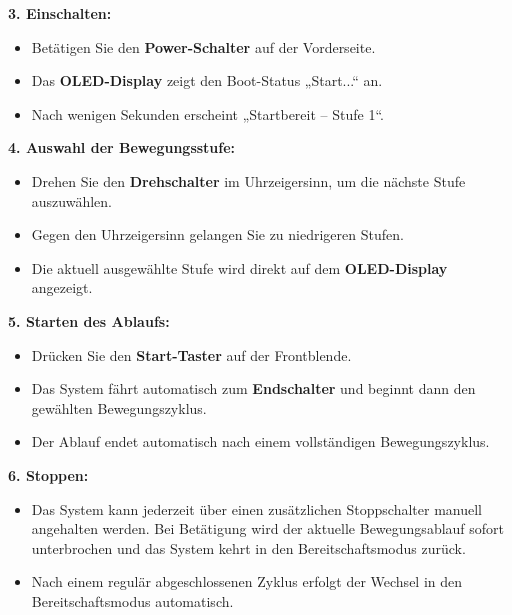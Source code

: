 \documentclass[a4paper,12pt,final]{report}
\begin{document}
		
		
		\noindent\textbf{3. Einschalten:}
		
		\begin{itemize}[leftmargin=1.5em]
		\item Betätigen Sie den \textbf{Power-Schalter} auf der Vorderseite. 
		\item Das \textbf{OLED-Display} zeigt den Boot-Status „Start...“ an. 
		\item Nach wenigen Sekunden erscheint „Startbereit – Stufe 1“. \\
    	\end{itemize}
		
		\noindent\textbf{4. Auswahl der Bewegungsstufe:}
		\begin{itemize}[leftmargin=1.5em]
		
		\item Drehen Sie den \textbf{Drehschalter} im Uhrzeigersinn, um die nächste Stufe auszuwählen. 
		\item Gegen den Uhrzeigersinn gelangen Sie zu niedrigeren Stufen. 
		\item Die aktuell ausgewählte Stufe wird direkt auf dem \textbf{OLED-Display} angezeigt. \\
    	\end{itemize}
		
		\noindent\textbf{5. Starten des Ablaufs:}
		\begin{itemize}[leftmargin=1.5em]
		
		\item Drücken Sie den \textbf{Start-Taster} auf der Frontblende. 
		\item Das System fährt automatisch zum \textbf{Endschalter} und beginnt dann den gewählten Bewegungszyklus. 
		\item Der Ablauf endet automatisch nach einem vollständigen Bewegungszyklus. \\
    	\end{itemize}
		
		\noindent\textbf{6. Stoppen:}
		\begin{itemize}[leftmargin=1.5em]
		
		\item Das System kann jederzeit über einen zusätzlichen Stoppschalter manuell angehalten werden. Bei Betätigung wird der aktuelle Bewegungsablauf sofort unterbrochen und das System kehrt in den Bereitschaftsmodus zurück.	
		\item Nach einem regulär abgeschlossenen Zyklus erfolgt der Wechsel in den Bereitschaftsmodus automatisch.

		
    	\end{itemize}
    \newpage
	
\end{document}
